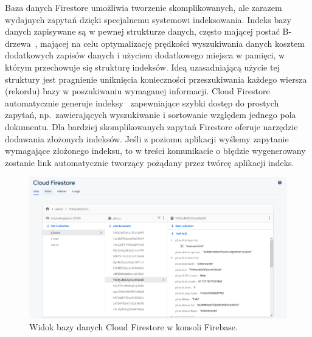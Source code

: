         Baza danych Firestore umożliwia tworzenie skomplikowanych, ale zarazem wydajnych zapytań dzięki specjalnemu systemowi indeksowania. Indeks bazy danych zapisywane są w pewnej strukturze danych, 
        często mającej postać B-drzewa~\cite{DBSYS}, mającej na celu optymalizację prędkości wyszukiwania danych kosztem dodatkowych zapisów danych i użyciem dodatkowego miejsca w pamięci, 
        w którym przechowuje się strukturę indeksów. Ideą uzasadniającą użycie tej struktury jest pragnienie uniknięcia konieczności przeszukiwania każdego wiersza (rekordu) bazy w poszukiwaniu wymaganej informacji. Cloud Firestore
        automatycznie generuje indeksy~\cite{FIRESTORE_IDX} zapewniające szybki dostęp do prostych zapytań, np.\ zawierających wyszukiwanie i sortowanie względem jednego pola dokumentu. Dla bardziej 
        skomplikowanych zapytań Firestore oferuje narzędzie dodawania złożonych indeksów. Jeśli z poziomu aplikacji wyślemy zapytanie wymagające złożonego indeksu, to w treści komunikacie o błędzie wygenerowany 
        zostanie link automatycznie tworzący pożądany przez twórcę aplikacji indeks. \\

        \vspace{1cm}
        \begin{figure}[!ht]%
            \centering
            \includegraphics[scale=0.40]{src/firestore_screen.png}
            \caption{Widok bazy danych Cloud Firestore w konsoli Firebase.\label{firestore_screen}}
            \qquad
        \end{figure} 

